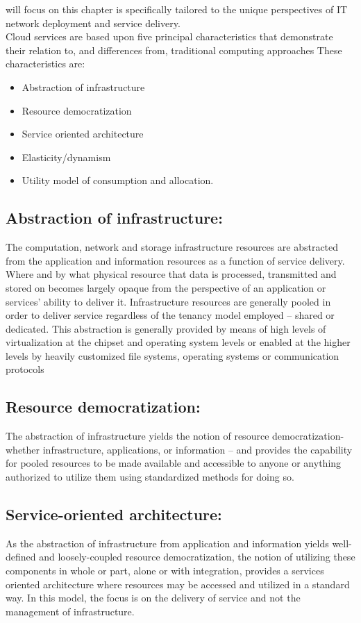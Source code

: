 \documentclass[11pt,a4paper]{report}
\begin{document}
will focus on this chapter is specifically tailored to the unique perspectives of IT network deployment and
service delivery.
\\Cloud services are based upon five principal characteristics that demonstrate their relation to, and
differences from, traditional computing approaches These characteristics
are:\\
\begin{itemize}
\item Abstraction of infrastructure
\item Resource democratization
\item Service oriented architecture
\item Elasticity/dynamism
\item Utility model of consumption and allocation.
\end{itemize}   
\subsection{Abstraction of infrastructure:}
The computation, network and storage infrastructure resources are
abstracted from the application and information resources as a function of service delivery. Where and by
what physical resource that data is processed, transmitted and stored on becomes largely opaque from the
perspective of an application or services’ ability to deliver it. Infrastructure resources are generally pooled
in order to deliver service regardless of the tenancy model employed – shared or dedicated. This
abstraction is generally provided by means of high levels of virtualization at the chipset and operating
system levels or enabled at the higher levels by heavily customized file systems, operating systems or
communication protocols
\subsection{Resource democratization:}
The abstraction of infrastructure yields the notion of resource
democratization- whether infrastructure, applications, or information – and provides the capability for
pooled resources to be made available and accessible to anyone or anything authorized to utilize them
using standardized methods for doing so.
\subsection{Service-oriented architecture:}
As the abstraction of infrastructure from application and information
yields well-defined and loosely-coupled resource democratization, the notion of utilizing these
components in whole or part, alone or with integration, provides a services oriented architecture where
resources may be accessed and utilized in a standard way. In this model, the focus is on the delivery of
service and not the management of infrastructure.
\end{document}
